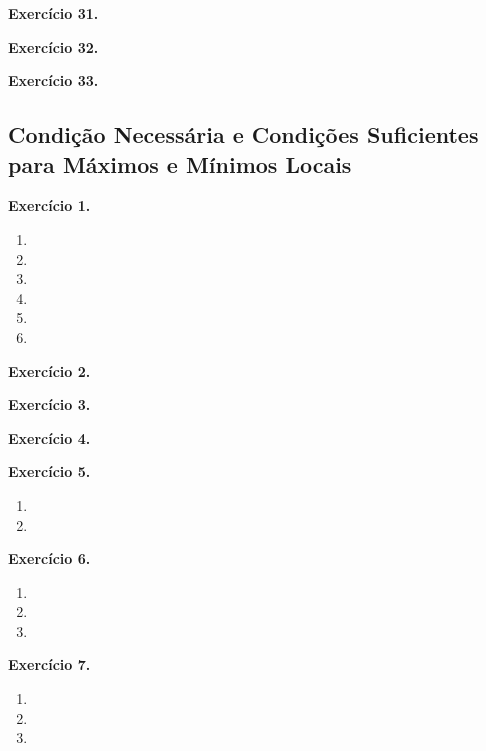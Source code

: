 \documentclass[12pt,a4paper]{article}
\begin{document}
\vspace{0.5cm}
\noindent\textbf{Exercício 31.}

\vspace{0.5cm}
\noindent\textbf{Exercício 32.}

\vspace{0.5cm}
\noindent\textbf{Exercício 33.}

\subsection{Condição Necessária e Condições Suficientes para Máximos e Mínimos Locais}

\vspace{0.5cm}
\noindent\textbf{Exercício 1.}
\begin{enumerate}
    \renewcommand{\theenumi}{\alph{enumi}}
    \renewcommand{\labelenumi}{\theenumi)}
    \item 
    \item 
    \item 
    \item 
    \item 
    \item 
\end{enumerate}

\vspace{0.5cm}
\noindent\textbf{Exercício 2.}

\vspace{0.5cm}
\noindent\textbf{Exercício 3.}

\vspace{0.5cm}
\noindent\textbf{Exercício 4.}

\vspace{0.5cm}
\noindent\textbf{Exercício 5.}
\begin{enumerate}
    \renewcommand{\theenumi}{\alph{enumi}}
    \renewcommand{\labelenumi}{\theenumi)}
    \item 
    \item 
\end{enumerate}

\vspace{0.5cm}
\noindent\textbf{Exercício 6.}
\begin{enumerate}
    \renewcommand{\theenumi}{\alph{enumi}}
    \renewcommand{\labelenumi}{\theenumi)}
    \item 
    \item 
    \item 
\end{enumerate}

\vspace{0.5cm}
\noindent\textbf{Exercício 7.}
\begin{enumerate}
    \renewcommand{\theenumi}{\alph{enumi}}
    \renewcommand{\labelenumi}{\theenumi)}
    \item 
    \item 
    \item 
\end{enumerate}
\end{document}
